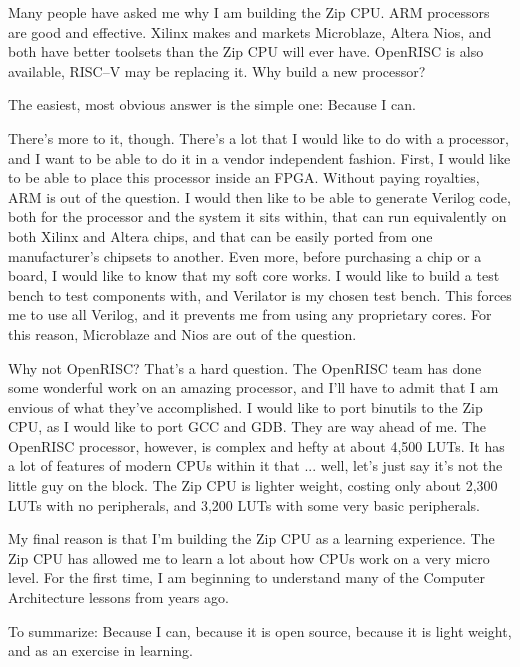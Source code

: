 \documentclass{gqtekspec}
\begin{document}
\begin{preface}
Many people have asked me why I am building the Zip CPU. ARM processors are
good and effective. Xilinx makes and markets Microblaze, Altera Nios, and both
have better toolsets than the Zip CPU will ever have. OpenRISC is also
available, RISC--V may be replacing it. Why build a new processor?

The easiest, most obvious answer is the simple one: Because I can.

There's more to it, though. There's a lot that I would like to do with a
processor, and I want to be able to do it in a vendor independent fashion.
First, I would like to be able to place this processor inside an FPGA.  Without
paying royalties, ARM is out of the question.  I would then like to be able to
generate Verilog code, both for the processor and the system it sits within,
that can run equivalently on both Xilinx and Altera chips, and that can be
easily ported from one manufacturer's chipsets to another. Even more, before
purchasing a chip or a board, I would like to know that my soft core works. I
would like to build a test bench to test components with, and Verilator is my
chosen test bench. This forces me to use all Verilog, and it prevents me from
using any proprietary cores. For this reason, Microblaze and Nios are out of
the question.

Why not OpenRISC? That's a hard question. The OpenRISC team has done some
wonderful work on an amazing processor, and I'll have to admit that I am
envious of what they've accomplished. I would like to port binutils to the
Zip CPU, as I would like to port GCC and GDB. They are way ahead of me. The
OpenRISC processor, however, is complex and hefty at about 4,500 LUTs. It has
a lot of features of modern CPUs within it that ... well, let's just say it's
not the little guy on the block. The Zip CPU is lighter weight, costing only
about 2,300 LUTs with no peripherals, and 3,200 LUTs with some very basic
peripherals.

My final reason is that I'm building the Zip CPU as a learning experience. The
Zip CPU has allowed me to learn a lot about how CPUs work on a very micro
level. For the first time, I am beginning to understand many of the Computer
Architecture lessons from years ago.

To summarize: Because I can, because it is open source, because it is light
weight, and as an exercise in learning. 

\end{preface}
\end{document}
